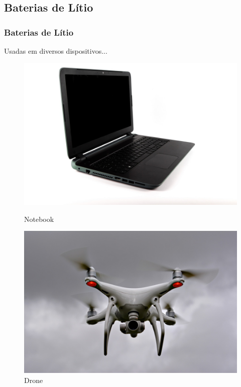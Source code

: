 \documentclass{beamer}
\begin{document}
	\subsection{Baterias de Lítio}	
	\begin{frame}\frametitle{Baterias de Lítio}		
	Usadas em diversos dispositivos...				\pause
	
	\begin{figure}[!ht]

	\begin{minipage}{\textwidth}
  \begin{minipage}{.45\textwidth}
      \centering
      \includegraphics[width=.85\textwidth,scale=0.5]{laptop1}
      \caption{Notebook}
      \label{fig:laptop1}      
    \end{minipage}													\pause
  \begin{minipage}{.45\textwidth}
    \center
      \includegraphics[width=.85\textwidth]{drone1}
      \caption{Drone}
      \label{fig:drone1}
    \end{minipage}
  \end{minipage}														\pause


\end{figure}
\end{frame}
\end{document}
